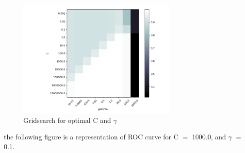 \begin{figure}[H]
\centering
\includegraphics[width=0.71\textwidth]{img/grid/grid_searchbone.png}
\caption{Gridsearch for optimal C and $\gamma$}
\label{fig:grid}
\end{figure}



the following figure is a representation of ROC curve for C $=$ 1000.0, and $\gamma$ $=$ 0.1.

